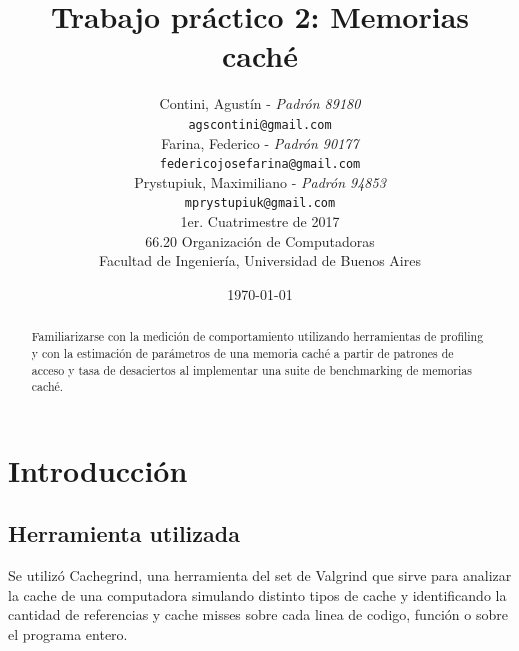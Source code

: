 \documentclass[a4paper,10pt]{article}
\title{ \textbf{Trabajo práctico 2: Memorias caché} }
\author{Contini, Agustín - \textit{Padrón 89180}			\\
            \texttt{ agscontini@gmail.com }				\\
            Farina, Federico - \textit{Padrón 90177}			\\
            \texttt{ federicojosefarina@gmail.com }				\\
            Prystupiuk, Maximiliano  - \textit{Padrón 94853  }			\\
            \texttt{ mprystupiuk@gmail.com  }					\\[2.5ex]
            1er. Cuatrimestre de 2017					\\[1.0ex]
            \normalsize{66.20 Organización de Computadoras}		\\
            \normalsize{Facultad de Ingeniería, Universidad de Buenos Aires}	\\
	}
\date{\today}
\begin{document}

\maketitle
\bigskip
\thispagestyle{empty}	%

\begin{abstract}
Familiarizarse con la medición de comportamiento utilizando herramientas
de profiling y con la estimación de parámetros de una memoria caché a partir de patrones de acceso y tasa de desaciertos al implementar una suite de
benchmarking de memorias caché.

\end{abstract}







\pagestyle{fancy}





\normalsize

\newpage
\tableofcontents	%

\vspace{2.0cm}

\newpage
\section{Introducción}

\subsection{Herramienta utilizada}
Se utilizó Cachegrind, una herramienta del set de Valgrind que sirve para analizar la cache de una computadora simulando distinto tipos de cache y identificando la cantidad de referencias y cache misses sobre cada linea de codigo, función o sobre el programa entero.
\end{document}
